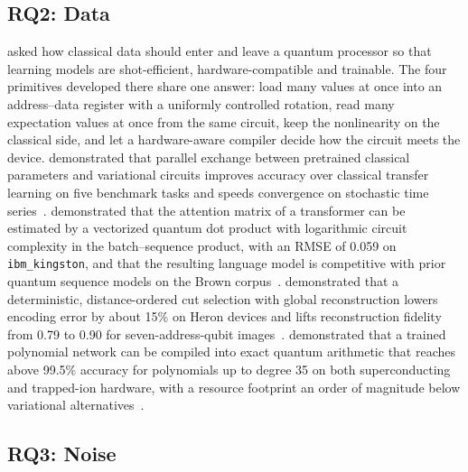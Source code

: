 \subsection{RQ2: Data}\label{sec:conclusion:rq2}

 asked how classical data should enter and leave a quantum processor so that learning models are shot-efficient, hardware-compatible and trainable. The four primitives developed there share one answer: load many values at once into an address--data register with a uniformly controlled rotation, read many expectation values at once from the same circuit, keep the nonlinearity on the classical side, and let a hardware-aware compiler decide how the circuit meets the device. \qpie{} demonstrated that parallel exchange between pretrained classical parameters and variational circuits improves accuracy over classical transfer learning on five benchmark tasks and speeds convergence on stochastic time series~\cite{guo2025qpie}. \vqt{} demonstrated that the attention matrix of a transformer can be estimated by a vectorized quantum dot product with logarithmic circuit complexity in the batch--sequence product, with an RMSE of 0.059 on \texttt{ibm\_kingston}, and that the resulting language model is competitive with prior quantum sequence models on the Brown corpus~\cite{guo2025vqt}. \shardq{} demonstrated that a deterministic, distance-ordered cut selection with global reconstruction lowers encoding error by about 15\% on Heron devices and lifts reconstruction fidelity from 0.79 to 0.90 for seven-address-qubit images~\cite{guo2025shardq}. \nnqa{} demonstrated that a trained polynomial network can be compiled into exact quantum arithmetic that reaches above 99.5\% accuracy for polynomials up to degree 35 on both superconducting and trapped-ion hardware, with a resource footprint an order of magnitude below variational alternatives~\cite{guo2026nnqa}.

\subsection{RQ3: Noise}\label{sec:conclusion:rq3}

